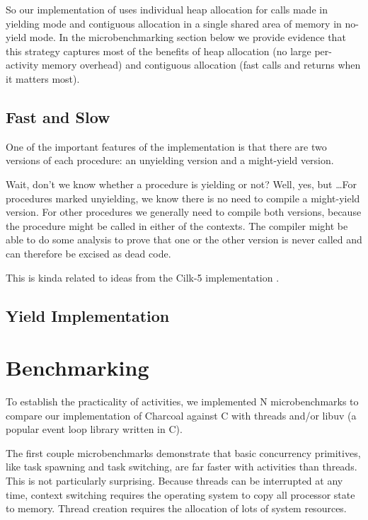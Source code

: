 \documentclass[10pt,preprint]{sigplanconf}
\begin{document}
So our implementation of \charcoal uses individual heap allocation for calls made in yielding mode and contiguous allocation in a single shared area of memory in no-yield mode.
In the microbenchmarking section below we provide evidence that this strategy captures most of the benefits of heap allocation (no large per-activity memory overhead) and contiguous allocation (fast calls and returns when it matters most).

\subsection{Fast and Slow}

One of the important features of the implementation is that there are
two versions of each procedure: an unyielding version and a might-yield
version.

Wait, don't we know whether a procedure is yielding or not?  Well, yes,
but \ldots For procedures marked unyielding, we know there is no need to
compile a might-yield version.  For other procedures we generally need
to compile both versions, because the procedure might be called in
either of the contexts.  The compiler might be able to do some analysis
to prove that one or the other version is never called and can therefore
be excised as dead code.

This is kinda related to ideas from the Cilk-5 implementation
\cite{Frigo1998}.

\subsection{Yield Implementation}

\section{Benchmarking}

To establish the practicality of activities, we implemented N
microbenchmarks to compare our implementation of Charcoal against C with
threads and/or libuv (a popular event loop library written in C).

The first couple microbenchmarks demonstrate that basic concurrency primitives, like task spawning and task switching, are far faster with activities than threads.
This is not particularly surprising.
Because threads can be interrupted at any time, context switching requires the operating system to copy all processor state to memory.
Thread creation requires the allocation of lots of system resources.
\end{document}
